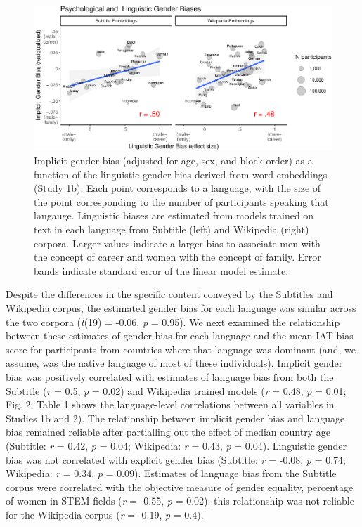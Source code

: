 \documentclass[man,floatsintext]{apa6}
\begin{document}
\begin{figure}
\centering
\includegraphics{iat_lang_pnas_files/figure-latex/unnamed-chunk-11-1.pdf}
\caption{\label{fig:unnamed-chunk-11}Implicit gender bias (adjusted for age, sex, and block order) as a function of the linguistic gender bias derived from word-embeddings (Study 1b). Each point corresponds to a language, with the size of the point corresponding to the number of participants speaking that langauge. Linguistic biases are estimated from models trained on text in each language from Subtitle (left) and Wikipedia (right) corpora. Larger values indicate a larger bias to associate men with the concept of career and women with the concept of family. Error bands indicate standard error of the linear model estimate.}
\end{figure}

Despite the differences in the specific content conveyed by the Subtitles and Wikipedia corpus, the estimated gender bias for each language was similar across the two corpora (\emph{t}(19) = -0.06, \emph{p} = 0.95). We next examined the relationship between these estimates of gender bias for each language and the mean IAT bias score for participants from countries where that language was dominant (and, we assume, was the native language of most of these individuals). Implicit gender bias was positively correlated with estimates of language bias from both the Subtitle (\emph{r} = 0.5, \emph{p} = 0.02) and Wikipedia trained models (\emph{r} = 0.48, \emph{p} = 0.01; Fig. 2; Table 1 shows the language-level correlations between all variables in Studies 1b and 2). The relationship between implicit gender bias and language bias remained reliable after partialling out the effect of median country age (Subtitle: \emph{r} = 0.42, \emph{p} = 0.04; Wikipedia: \emph{r} = 0.43, \emph{p} = 0.04). Linguistic gender bias was not correlated with explicit gender bias (Subtitle: \emph{r} = -0.08, \emph{p} = 0.74; Wikipedia: \emph{r} = 0.34, \emph{p} = 0.09). Estimates of language bias from the Subtitle corpus were correlated with the objective measure of gender equality, percentage of women in STEM fields (\emph{r} = -0.55, \emph{p} = 0.02); this relationship was not reliable for the Wikipedia corpus (\emph{r} = -0.19, \emph{p} = 0.4).
\end{document}
